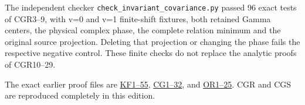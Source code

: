 The independent checker \nolinkurl{check_invariant_covariance.py} passed 96 exact tests of CGR3--9, with v=0 and v=1 finite-shift fixtures, both retained Gamma centers, the physical complex phase, the complete relation minimum and the original source projection. Deleting that projection or changing the phase fails the respective negative control. These finite checks do not replace the analytic proofs of CGR10--29.

The exact earlier proof files are \href{https://github.com/KokunoYumeto/zeta-function-research-reader/blob/0fd693c844aad9117e30ec447c59864a28af10f3/workbenches/splitzero-tandem/continuations/20260921-native-spectral-real-pair/003/ACTUAL_KERNEL_FILTRATION_AND_GRAPH.tex\#L12}{KF1--55}, \href{https://github.com/KokunoYumeto/zeta-function-research-reader/blob/0fd693c844aad9117e30ec447c59864a28af10f3/workbenches/splitzero-tandem/continuations/20260921-native-spectral-real-pair/003/COMPLETE_CONDUCTOR_GRAPH_METRIC.tex}{CG1--32}, and \href{https://github.com/KokunoYumeto/zeta-function-research-reader/blob/0fd693c844aad9117e30ec447c59864a28af10f3/workbenches/splitzero-tandem/continuations/20260921-native-spectral-real-pair/003/COMPLETE_CONDUCTOR_ROOT_GEOMETRY.tex\#L38}{OR1--25}. CGR and CGS are reproduced completely in this edition.

